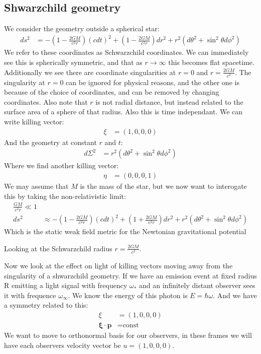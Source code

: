 \subsection{Shwarzchild geometry}
We consider the geometry outside a spherical star:
\begin{align*}
	ds^2 &= -\left(1 -\frac{2GM}{c^2 r}\right)(cdt)^2 + \left(1- \frac{2GM}{c^2 r}\right)dr^2 + r^2 (d\theta^2 + \sin^2\theta d\phi^2)
\end{align*}
We refer to these coordinates as Schwarzchild coordinates. We can immediately see this is spherically symmetric, and that as $r\to\infty$ this becomes flat spacetime.
Additionally we see there are coordinate singularities at $r=0$ and $r=\frac{2GM}{c^2}$. The singularity at $r=0$ can be ignored for physical reasons, and the other one is because of the choice of coordinates, and can be removed by changing coordinates.
Also note that $r$ is not radial distance, but instead related to the surface area of a sphere of that radius. Also this is time independant. We can write killing vector:
\begin{align*}
	\xi &= (1,0,0,0)
\end{align*}
And the geometry at constant $r$ and $t$:
\begin{align*}
	d\Sigma^2 &= r^2(d\theta^2 + \sin^2\theta d\phi^2)
\end{align*}
Where we find another killing vector:
\begin{align*}
	\eta &= (0,0,0,1)
\end{align*}
We may assume that $M$ is the mass of the star, but we now want to interogate this by taking the non-relativistic limit:
\begin{align*}
	\frac{GM}{c^2 r} \ll 1 \\
	ds^2 &\approx -\left(1 - \frac{2GM}{c^2r}\right)(cdt)^2 + \left(1+ \frac{2GM}{c^2 r}\right)dr^2 + r^2 (d\theta^2 + \sin^2\theta d\phi^2)
\end{align*}
Which is the static weak field metric for the Newtonian gravitational potential

Looking at the Schwarzchild radius $r = \frac{2GM}{c^2}$.

Now we look at the effect on light of killing vectors moving away from the singularity of a shwarzchild geometry.
If we have an emission event at fixed radius R emitting a light signal with frequency $\omega_*$ and an infinitely distant observer sees it with frequence $\omega_\infty$.
We know the energy of this photon is $E=\hbar\omega$. And we have a symmetry related to this:
\begin{align*}
	\xi &= (1,0,0,0) \\
	\bm{\xi}\cdot\bm{p} &= \text{const}
\end{align*}
We want to move to orthonormal basis for our observers, in these frames we will have each observers velocity vector be $u = (1,0,0,0)$.

